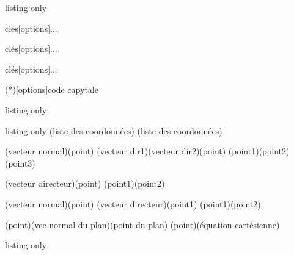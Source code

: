 \documentclass[a4paper,french,11pt]{article}
\begin{document}
\begin{PresCodeTexPL}{listing only}
\begin{TerminalWin}[largeur]{clés}[options]...\end{TerminalWin}
\begin{TerminalUnix}[largeur]{clés}[options]...\end{TerminalUnix}
\begin{TerminalOSX}[largeur]{clés}[options]...\end{TerminalOSX}

\CartoucheCapytale(*)[options]{code capytale}
\end{PresCodeTexPL}

\begin{PresCodeTexPL}{listing only}
\PaveTikz[options]
\TetraedreTikz[options]

\CercleTrigo[clés]
\end{PresCodeTexPL}

\begin{PresCodeTexPL}{listing only}
(liste des coordonnées)
(liste des coordonnées)

\TrouveEqCartPlan[clés](vecteur normal)(point)
\TrouveEqCartPlan[clés](vecteur dir1)(vecteur dir2)(point)
\TrouveEqCartPlan[clés](point1)(point2)(point3)

\TrouveEqParamDroite[clés](vecteur directeur)(point)
\TrouveEqParamDroite[clés](point1)(point2)

\TrouveEqCartDroite[clés](vecteur normal)(point)
(vecteur directeur)(point1)
\TrouveEqCartDroite[clés](point1)(point2)

\TrouveDistancePtPlan(point)(vec normal du plan)(point du plan)
\TrouveDistancePtPlan(point)(équation cartésienne)
\end{PresCodeTexPL}

\begin{PresCodeTexPL}{listing only}
\end{PresCodeTexPL}
\end{document}
